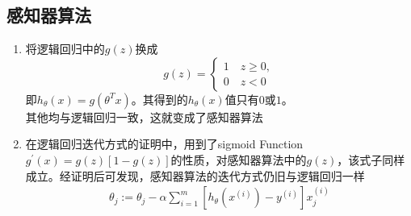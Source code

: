 \subsection{感知器算法}
\begin{enumerate}
	\item 将逻辑回归中的$g(z)$换成
	\[ g(z)=\begin{cases}
	1 \quad z \geq 0, \\
	0 \quad z <0
	\end{cases} \]
	即$h_\theta(x) = g(\theta^Tx)$。其得到的$h_\theta(x)$值只有$0$或$1$。 \\
	其他均与逻辑回归一致，这就变成了感知器算法
	\item 在逻辑回归迭代方式的证明中，用到了sigmoid Function $g^{'}{(x)} = g(z)\left[1-g(z)\right]$的性质，对感知器算法中的$g(z)$，该式子同样成立。经证明后可发现，感知器算法的迭代方式仍旧与逻辑回归一样
	\begin{align}
		\theta_j :=  \theta_j - \alpha \sum_{i=1}^{m} \left[h_\theta(x^{(i)}) - y^{(i)} \right]x_j^{(i)}
	\end{align}
\end{enumerate}
















